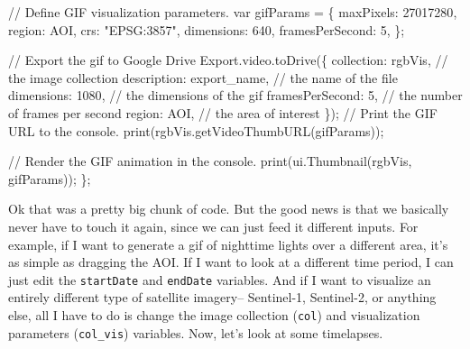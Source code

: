 \documentclass[
  letterpaper,
  DIV=11,
  numbers=noendperiod]{scrreprt}
\newenvironment{Shaded}{\begin{snugshade}}{\end{snugshade}}
\newcommand{\AttributeTok}[1]{\textcolor[rgb]{0.40,0.45,0.13}{#1}}
\newcommand{\CommentTok}[1]{\textcolor[rgb]{0.37,0.37,0.37}{#1}}
\newcommand{\DataTypeTok}[1]{\textcolor[rgb]{0.68,0.00,0.00}{#1}}
\newcommand{\DecValTok}[1]{\textcolor[rgb]{0.68,0.00,0.00}{#1}}
\newcommand{\FunctionTok}[1]{\textcolor[rgb]{0.28,0.35,0.67}{#1}}
\newcommand{\KeywordTok}[1]{\textcolor[rgb]{0.00,0.23,0.31}{#1}}
\newcommand{\NormalTok}[1]{\textcolor[rgb]{0.00,0.23,0.31}{#1}}
\newcommand{\OperatorTok}[1]{\textcolor[rgb]{0.37,0.37,0.37}{#1}}
\newcommand{\StringTok}[1]{\textcolor[rgb]{0.13,0.47,0.30}{#1}}
\begin{document}
\begin{Shaded}
\begin{Highlighting}[]
  \CommentTok{// Define GIF visualization parameters.}
  \KeywordTok{var}\NormalTok{ gifParams }\OperatorTok{=}\NormalTok{ \{}
    \DataTypeTok{maxPixels}\OperatorTok{:} \DecValTok{27017280}\OperatorTok{,}
    \DataTypeTok{region}\OperatorTok{:}\NormalTok{ AOI}\OperatorTok{,}
    \DataTypeTok{crs}\OperatorTok{:} \StringTok{"EPSG:3857"}\OperatorTok{,}
    \DataTypeTok{dimensions}\OperatorTok{:} \DecValTok{640}\OperatorTok{,}
    \DataTypeTok{framesPerSecond}\OperatorTok{:} \DecValTok{5}\OperatorTok{,}
\NormalTok{  \}}\OperatorTok{;}

  \CommentTok{// Export the gif to Google Drive}
\NormalTok{  Export}\OperatorTok{.}\AttributeTok{video}\OperatorTok{.}\FunctionTok{toDrive}\NormalTok{(\{}
    \DataTypeTok{collection}\OperatorTok{:}\NormalTok{ rgbVis}\OperatorTok{,} \CommentTok{// the image collection}
    \DataTypeTok{description}\OperatorTok{:}\NormalTok{ export\_name}\OperatorTok{,} \CommentTok{// the name of the file}
    \DataTypeTok{dimensions}\OperatorTok{:} \DecValTok{1080}\OperatorTok{,} \CommentTok{// the dimensions of the gif}
    \DataTypeTok{framesPerSecond}\OperatorTok{:} \DecValTok{5}\OperatorTok{,} \CommentTok{// the number of frames per second}
    \DataTypeTok{region}\OperatorTok{:}\NormalTok{ AOI}\OperatorTok{,} \CommentTok{// the area of interest}
\NormalTok{  \})}\OperatorTok{;}
  \CommentTok{// Print the GIF URL to the console.}
  \FunctionTok{print}\NormalTok{(rgbVis}\OperatorTok{.}\FunctionTok{getVideoThumbURL}\NormalTok{(gifParams))}\OperatorTok{;}

  \CommentTok{// Render the GIF animation in the console.}
  \FunctionTok{print}\NormalTok{(ui}\OperatorTok{.}\FunctionTok{Thumbnail}\NormalTok{(rgbVis}\OperatorTok{,}\NormalTok{ gifParams))}\OperatorTok{;}
\NormalTok{\}}\OperatorTok{;}
\end{Highlighting}
\end{Shaded}

Ok that was a pretty big chunk of code. But the good news is that we
basically never have to touch it again, since we can just feed it
different inputs. For example, if I want to generate a gif of nighttime
lights over a different area, it's as simple as dragging the AOI. If I
want to look at a different time period, I can just edit the
\texttt{startDate} and \texttt{endDate} variables. And if I want to
visualize an entirely different type of satellite imagery-- Sentinel-1,
Sentinel-2, or anything else, all I have to do is change the image
collection (\texttt{col}) and visualization parameters
(\texttt{col\_vis}) variables. Now, let's look at some timelapses.
\end{document}

